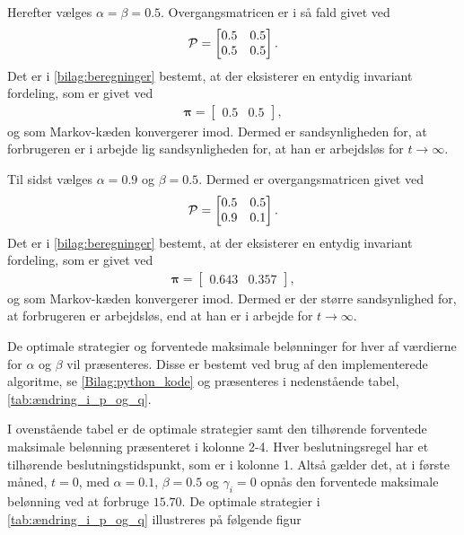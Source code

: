 Herefter vælges $\alpha = \beta = 0.5$. Overgangsmatricen er i så fald givet ved
\begin{align*}
    \P=\begin{bmatrix}0.5 & 0.5\\ 0.5 & 0.5\end{bmatrix}.
\end{align*}
Det er i \autoref{bilag:beregninger} bestemt, at der eksisterer en entydig invariant fordeling, som er givet ved
\begin{align*}
    \bm \pi =\begin{bmatrix}0.5 & 0.5\end{bmatrix},
\end{align*}
og som Markov-kæden konvergerer imod. Dermed er sandsynligheden for, at forbrugeren er i arbejde lig sandsynligheden for, at han er arbejdsløs for $t \to \infty$. 

Til sidst vælges $\alpha=0.9$ og $\beta=0.5$. Dermed er overgangsmatricen givet ved
\begin{align*}
    \P=\begin{bmatrix}0.5 & 0.5\\ 0.9 & 0.1\end{bmatrix}.
\end{align*}
Det er i \autoref{bilag:beregninger} bestemt, at der eksisterer en entydig invariant fordeling, som er givet ved
\begin{align*}
    \bm \pi =\begin{bmatrix}0.643 & 0.357\end{bmatrix},
\end{align*}
og som Markov-kæden konvergerer imod. Dermed er der større sandsynlighed for, at forbrugeren er arbejdsløs, end at han er i arbejde for $t \to \infty$.

De optimale strategier og forventede maksimale belønninger for hver af værdierne for $\alpha$ og $\beta$ vil præsenteres. Disse er bestemt ved brug af den implementerede algoritme, se \autoref{Bilag:python_kode} og præsenteres i nedenstående tabel, \autoref{tab:ændring_i_p_og_q}.



I ovenstående tabel er de optimale strategier samt den tilhørende forventede maksimale belønning præsenteret i kolonne 2-4. Hver beslutningsregel har et tilhørende beslutningstidspunkt, som er i kolonne 1. Altså gælder det, at i første måned, $t=0$, med $\alpha=0.1$, $\beta=0.5$ og $\gamma_i=0$ opnås den forventede maksimale belønning ved at forbruge $15.70$. De optimale strategier i \autoref{tab:ændring_i_p_og_q} illustreres på følgende figur

